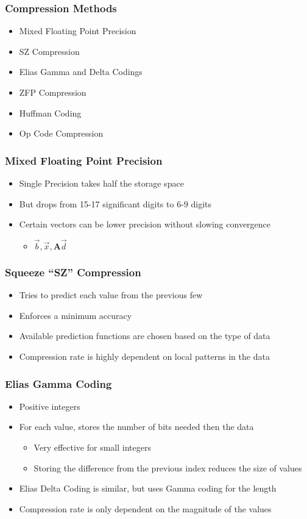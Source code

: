 \documentclass{beamer}
\newcommand{\mat}[1]{\mathbf{#1}}
\begin{document}
\begin{frame}
	\frametitle{Compression Methods}
	\begin{itemize}
		\item<1-2> Mixed Floating Point Precision
		\item<1-2> SZ Compression
		\item<1-2> Elias Gamma and Delta Codings
		\item<1> ZFP Compression
		\item<1> Huffman Coding
		\item<1> Op Code Compression
	\end{itemize}
\end{frame}

\begin{frame}
	\frametitle{Mixed Floating Point Precision}
	\begin{itemize}
		\item Single Precision takes half the storage space
		\item But drops from 15-17 significant digits to 6-9 digits
		\item Certain vectors can be lower precision without slowing convergence
		\begin{itemize}
			\item \(\vec{b}, \vec{x}, \mat{A}\vec{d}\)
		\end{itemize}
	\end{itemize}
\end{frame}

\begin{frame}
	\frametitle{Squeeze ``SZ'' Compression}
	\begin{itemize}
		\item Tries to predict each value from the previous few
		\item Enforces a minimum accuracy
		\item Available prediction functions are chosen based on the type of data
		\item Compression rate is highly dependent on local patterns in the data
	\end{itemize}
\end{frame}

\begin{frame}
	\frametitle{Elias Gamma Coding}
	\begin{itemize}
		\item Positive integers
		\item For each value, stores the number of bits needed then the data
		\begin{itemize}
			\item Very effective for small integers
			\item Storing the difference from the previous index reduces the size of values
		\end{itemize}
		\item Elias Delta Coding is similar, but uses Gamma coding for the length
		\item Compression rate is only dependent on the magnitude of the values
	\end{itemize}
\end{frame}
\end{document}
